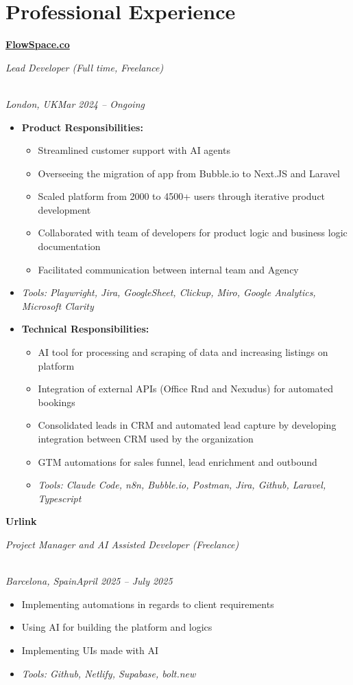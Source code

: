 \documentclass[a4paper,10pt]{article}
\newcommand{\role}[4]{\vspace{3pt}\noindent\hspace{0.6em}\parbox[t]{0.38\textwidth}{\raggedright\textbf{#1}}\hfill\parbox[t]{0.58\textwidth}{\raggedleft\textit{#2}}\\{\textit{#3}\hfill\textit{#4}}\vspace{1pt}}
\begin{document}
\section{Professional Experience}
\role{\href{https://flowspace.co}{FlowSpace.co}}{Lead Developer (Full time, Freelance)}{London, UK}{Mar 2024 -- Ongoing}
\begin{itemize}
\item \textbf{Product Responsibilities:}
\begin{itemize}[label=--]
\item Streamlined customer support with AI agents
\item Overseeing the migration of app from Bubble.io to Next.JS and Laravel
\item Scaled platform from 2000 to 4500+ users through iterative product development
\item Collaborated with team of developers for product logic and business logic documentation
\item Facilitated communication between internal team and Agency
\end{itemize}
\item \textit{Tools: Playwright, Jira, GoogleSheet, Clickup, Miro, Google Analytics, Microsoft Clarity}
\item \textbf{Technical Responsibilities:}
\begin{itemize}[label=--]
\item AI tool for processing and scraping of data and increasing listings on platform
\item Integration of external APIs (Office Rnd and Nexudus) for automated bookings
\item Consolidated leads in CRM and automated lead capture by developing integration between CRM used by the organization
\item GTM automations for sales funnel, lead enrichment and outbound
\item \textit{Tools: Claude Code, n8n, Bubble.io, Postman, Jira, Github, Laravel, Typescript}
\end{itemize}
\end{itemize}

\role{Urlink}{Project Manager and AI Assisted Developer (Freelance)}{Barcelona, Spain}{April 2025 -- July 2025}
\begin{itemize}
\item Implementing automations in regards to client requirements
\item Using AI for building the platform and logics
\item Implementing UIs made with AI
\item \textit{Tools: Github, Netlify, Supabase, bolt.new}
\end{itemize}
\end{document}
